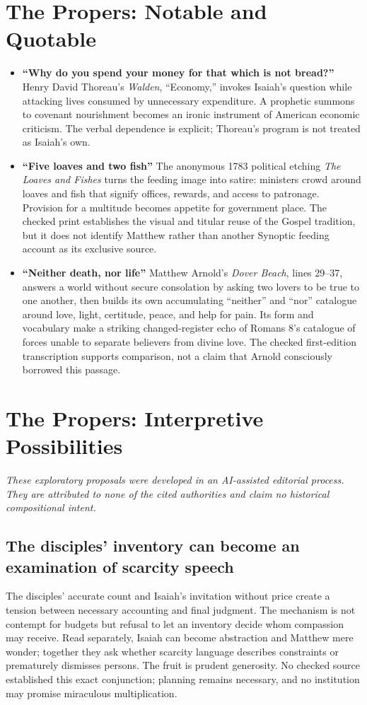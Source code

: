 \section*{The Propers: Notable and Quotable}
{\small
\begin{itemize}
\item \textbf{“Why do you spend your money for that which is not bread?”\enspace{}} Henry David Thoreau's \emph{Walden}, “Economy,” invokes Isaiah's question while attacking lives consumed by unnecessary expenditure. A prophetic summons to covenant nourishment becomes an ironic instrument of American economic criticism. The verbal dependence is explicit; Thoreau's program is not treated as Isaiah's own.
\item \textbf{“Five loaves and two fish”\enspace{}} The anonymous 1783 political etching \emph{The Loaves and Fishes} turns the feeding image into satire: ministers crowd around loaves and fish that signify offices, rewards, and access to patronage. Provision for a multitude becomes appetite for government place. The checked print establishes the visual and titular reuse of the Gospel tradition, but it does not identify Matthew rather than another Synoptic feeding account as its exclusive source.
\item \textbf{“Neither death, nor life”\enspace{}} Matthew Arnold's \emph{Dover Beach}, lines 29--37, answers a world without secure consolation by asking two lovers to be true to one another, then builds its own accumulating “neither” and “nor” catalogue around love, light, certitude, peace, and help for pain. Its form and vocabulary make a striking changed-register echo of Romans 8's catalogue of forces unable to separate believers from divine love. The checked first-edition transcription supports comparison, not a claim that Arnold consciously borrowed this passage.
\end{itemize}}

\section*{The Propers: Interpretive Possibilities}
\noindent\emph{These exploratory proposals were developed in an AI-assisted editorial process. They are attributed to none of the cited authorities and claim no historical compositional intent.}

\subsection*{The disciples' inventory can become an examination of scarcity speech\enspace{}}
The disciples' accurate count and Isaiah's invitation without price create a tension between necessary accounting and final judgment. The mechanism is not contempt for budgets but refusal to let an inventory decide whom compassion may receive. Read separately, Isaiah can become abstraction and Matthew mere wonder; together they ask whether scarcity language describes constraints or prematurely dismisses persons. The fruit is prudent generosity. No checked source established this exact conjunction; planning remains necessary, and no institution may promise miraculous multiplication.

